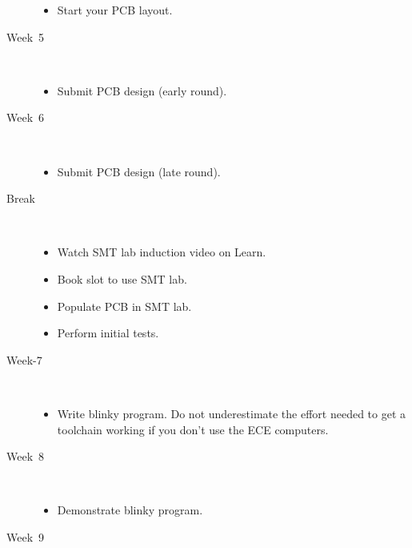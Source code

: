 \documentclass[11pt, a4paper]{article}
\begin{document}
\begin{description}
\begin{itemize}
  \item Start your PCB layout.
  \end{itemize}

\item [Week~5]\mbox{}\\[-0.4cm]

  \begin{itemize}
  \item Submit PCB design (early round).
  \end{itemize}

\item [Week~6]\mbox{}\\[-0.4cm]

  \begin{itemize}
  \item Submit PCB design (late round).
  \end{itemize}

\item [Break]\mbox{}\\[-0.4cm]

  \begin{itemize}
  \item Watch SMT lab induction video on Learn.

  \item Book slot to use SMT lab.

  \item Populate PCB in SMT lab.

  \item Perform initial tests.
  \end{itemize}

\item [Week-7]\mbox{}\\[-0.4cm]

  \begin{itemize}
  \item Write blinky program.  Do not underestimate the effort needed
    to get a toolchain working if you don't use the ECE computers.
  \end{itemize}

\item [Week~8]\mbox{}\\[-0.4cm]

  \begin{itemize}
  \item Demonstrate blinky program.
  \end{itemize}

\item [Week~9]\mbox{}\\[-0.4cm]


\end{description}
\end{document}
